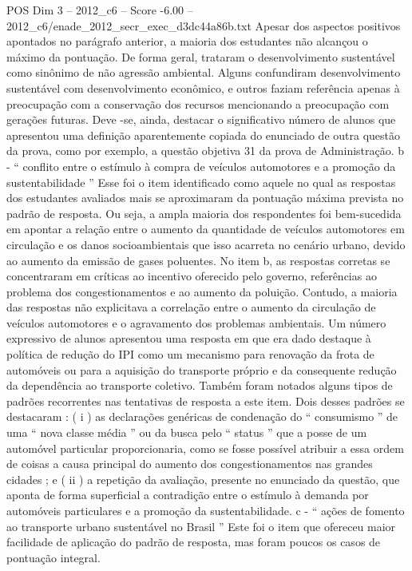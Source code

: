 \begin{textsample}{POS Dim 3 – 2012\_c6 – Score -6.00 – 2012\_c6/enade\_2012\_secr\_exec\_d3dc44a86b.txt}
Apesar dos aspectos positivos apontados no parágrafo anterior, a maioria dos estudantes não alcançou o máximo da pontuação.
De forma geral, trataram o desenvolvimento sustentável como sinônimo de não agressão ambiental.
Alguns confundiram desenvolvimento sustentável com desenvolvimento econômico, e outros faziam referência apenas à preocupação com a conservação dos recursos mencionando a preocupação com gerações futuras.
Deve -se, ainda, destacar o significativo número de alunos que apresentou uma definição aparentemente copiada do enunciado de outra questão da prova, como por exemplo, a questão objetiva 31 da prova de Administração. b - “ conflito entre o estímulo à compra de veículos automotores e a promoção da sustentabilidade ” Esse foi o item identificado como aquele no qual as respostas dos estudantes avaliados mais se aproximaram da pontuação máxima prevista no padrão de resposta.
Ou seja, a ampla maioria dos respondentes foi bem-sucedida em apontar a relação entre o aumento da quantidade de veículos automotores em circulação e os danos socioambientais que isso acarreta no cenário urbano, devido ao aumento da emissão de gases poluentes.
No item b, as respostas corretas se concentraram em críticas ao incentivo oferecido pelo governo, referências ao problema dos congestionamentos e ao aumento da poluição.
Contudo, a maioria das respostas não explicitava a correlação entre o aumento da circulação de veículos automotores e o agravamento dos problemas ambientais.
Um número expressivo de alunos apresentou uma resposta em que era dado destaque à política de redução do IPI como um mecanismo para renovação da frota de automóveis ou para a aquisição do transporte próprio e da consequente redução da dependência ao transporte coletivo.
Também foram notados alguns tipos de padrões recorrentes nas tentativas de resposta a este item.
Dois desses padrões se destacaram : ( i ) as declarações genéricas de condenação do “ consumismo ” de uma “ nova classe média ” ou da busca pelo “ status ” que a posse de um automóvel particular proporcionaria, como se fosse possível atribuir a essa ordem de coisas a causa principal do aumento dos congestionamentos nas grandes cidades ; e ( ii ) a repetição da avaliação, presente no enunciado da questão, que aponta de forma superficial a contradição entre o estímulo à demanda por automóveis particulares e a promoção da sustentabilidade. c - “ ações de fomento ao transporte urbano sustentável no Brasil ” Este foi o item que ofereceu maior facilidade de aplicação do padrão de resposta, mas foram poucos os casos de pontuação integral.

\end{textsample}
